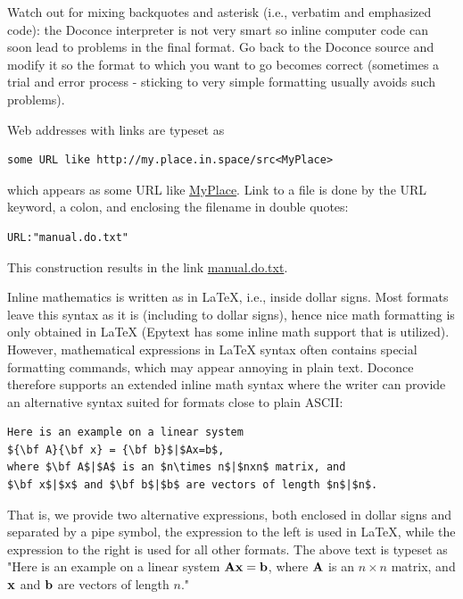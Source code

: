 \documentclass{article}
\begin{document}
Watch out for mixing backquotes and asterisk (i.e., verbatim and
emphasized code): the Doconce interpreter is not very smart so inline
computer code can soon lead to problems in the final format. Go back to the
Doconce source and modify it so the format to which you want to go
becomes correct (sometimes a trial and error process - sticking to
very simple formatting usually avoids such problems).

Web addresses with links are typeset as
\begin{Verbatim}[fontsize=\fontsize{9pt}{9pt},tabsize=8,baselinestretch=0.85,
fontfamily=tt,xleftmargin=7mm]
some URL like http://my.place.in.space/src<MyPlace>
\end{Verbatim}
\noindent
which appears as some URL like \href{http://my.place.in.space/src}{MyPlace}.
Link to a file is done by the URL keyword, a colon, and enclosing the
filename in double quotes:
\begin{Verbatim}[fontsize=\fontsize{9pt}{9pt},tabsize=8,baselinestretch=0.85,
fontfamily=tt,xleftmargin=7mm]
URL:"manual.do.txt"
\end{Verbatim}
\noindent
This construction results in the link \href{manual.do.txt}{manual.do.txt}.


Inline mathematics is written as in {\LaTeX}, i.e., inside dollar signs.
Most formats leave this syntax as it is (including to dollar signs),
hence nice math formatting is only obtained in {\LaTeX} (Epytext has some
inline math support that is utilized).  However, mathematical
expressions in {\LaTeX} syntax often contains special formatting
commands, which may appear annoying in plain text. Doconce therefore
supports an extended inline math syntax where the writer can provide
an alternative syntax suited for formats close to plain ASCII:
\begin{Verbatim}[fontsize=\fontsize{9pt}{9pt},tabsize=8,baselinestretch=0.85,
fontfamily=tt,xleftmargin=7mm]
Here is an example on a linear system 
${\bf A}{\bf x} = {\bf b}$|$Ax=b$, 
where $\bf A$|$A$ is an $n\times n$|$nxn$ matrix, and 
$\bf x$|$x$ and $\bf b$|$b$ are vectors of length $n$|$n$.
\end{Verbatim}
\noindent
That is, we provide two alternative expressions, both enclosed in
dollar signs and separated by a pipe symbol, the expression to the
left is used in {\LaTeX}, while the expression to the right is used for
all other formats.  The above text is typeset as "Here is an example
on a linear system ${\bf A}{\bf x} = {\bf b}$, where $\bf A$ 
is an $n\times n$ matrix, and $\bf x$ and $\bf b$
are vectors of length $n$."
\end{document}
